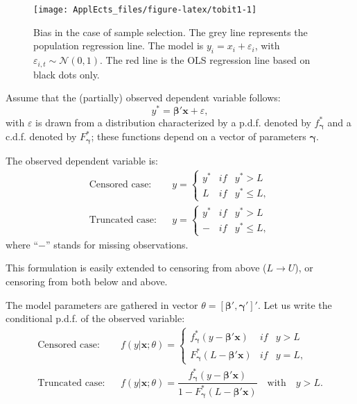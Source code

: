 \documentclass[
  12pt,
]{book}
\theoremstyle{definition}
\theoremstyle{definition}
\theoremstyle{definition}
\theoremstyle{definition}
\theoremstyle{remark}
\begin{document}
\begin{figure}
\texttt{[image: ApplEcts\_files/figure-latex/tobit1-1]} \caption{Bias in the case of sample selection. The grey line represents the population regression line. The model is $y_i = x_i + \varepsilon_i$, with $\varepsilon_{i,t} \sim \mathcal{N}(0,1)$. The red line is the OLS regression line based on black dots only.}\label{fig:tobit1}
\end{figure}

Assume that the (partially) observed dependent variable follows:
\[
y^* = \boldsymbol\beta'\mathbf{x} + \varepsilon,
\]
with \(\varepsilon\) is drawn from a distribution characterized by a p.d.f. denoted by \(f_{\boldsymbol\gamma}^*\) and a c.d.f. denoted by \(F_{\boldsymbol\gamma}^*\); these functions depend on a vector of parameters \(\boldsymbol{\gamma}\).

The observed dependent variable is:
\begin{eqnarray*}
\mbox{Censored case:}&&y = \left\{
\begin{array}{ccc}
y^* &if& y^*>L \\
L &if& y^*\le L,
\end{array}
\right.\\
\mbox{Truncated case:}&&y = \left\{
\begin{array}{ccc}
y^* &if& y^*>L \\
- &if& y^*\le L,
\end{array}
\right.
\end{eqnarray*}
where ``\(-\)'' stands for missing observations.

This formulation is easily extended to censoring from above (\(L \rightarrow U\)), or censoring from both below and above.

The model parameters are gathered in vector \(\theta = [\boldsymbol\beta',\boldsymbol\gamma']'\). Let us write the conditional p.d.f. of the observed variable:
\begin{eqnarray*}
\mbox{Censored case:}&& f(y|\mathbf{x};\theta) = \left\{
\begin{array}{ccc}
f_{\boldsymbol\gamma}^*(y -  \boldsymbol\beta'\mathbf{x}) &if& y>L \\
F_{\boldsymbol\gamma}^*(L-  \boldsymbol\beta'\mathbf{x}) &if& y = L,
\end{array}
\right.\\
\mbox{Truncated case:}&&  f(y|\mathbf{x};\theta) =
\dfrac{f_{\boldsymbol\gamma}^*(y -  \boldsymbol\beta'\mathbf{x})}{1 - F_{\boldsymbol\gamma}^*(L-  \boldsymbol\beta'\mathbf{x})} \quad \mbox{with} \quad y>L.
\end{eqnarray*}
\end{document}
